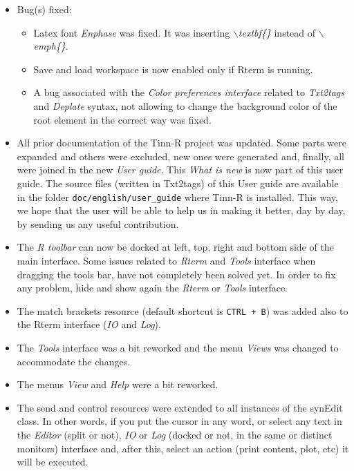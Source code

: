 \begin{itemize}
  \item Bug(s) fixed:
    \begin{itemize}
      \item Latex font \textit{Enphase} was fixed. It was inserting
        \textit{$\backslash$textbf\{\}} instead of
        \textit{$\backslash$emph\{\}}.
      \item Save and load workspace is now enabled only if Rterm is
        running.
      \item A bug associated with the \textit{Color preferences interface}
        related to \textit{Txt2tags} and \textit{Deplate} syntax, not
        allowing to change the background color of the root element in
        the correct way was fixed.
    \end{itemize}
  \item All prior documentation of the Tinn-R project was updated. Some
    parts were expanded and others were excluded, new ones were generated and,
    finally, all were joined in the new \textit{User guide}. This
    \textit{What is new} is now part of this user guide. The source
    files (written in Txt2tags) of this User guide are available in the
    folder \texttt{doc/english/user\_guide} where Tinn-R is installed.
    This way, we hope that the user will be able to help us in making
    it better, day by day, by sending us any useful contribution.
  \item The \textit{R toolbar} can now be docked at left, top, right and
    bottom side of the main interface. Some issues related to \textit{Rterm}
    and \textit{Tools} interface when dragging the \RR{} tools bar, have
    not completely been solved yet. In order to fix any problem, hide and
    show again the \textit{Rterm} or \textit{Tools} interface.
  \item The match brackets resource (default shortcut is \texttt{CTRL + B})
    was added also to the Rterm interface (\textit{IO} and \textit{Log}).
  \item The \textit{Tools} interface was a bit reworked and the menu
    \textit{Views} was changed to accommodate the changes.
  \item The menus \textit{View} and \textit{Help} were a bit reworked.
  \item The send and control \RR{} resources were extended to all
    instances of the synEdit class. In other words, if you put the
    cursor in any word, or select any text in the \textit{Editor}
    (split or not), \textit{IO} or \textit{Log} (docked or not, in the
    same or distinct monitors) interface and, after this, select an
    action (print content, plot, etc) it will be executed.
\end{itemize}
